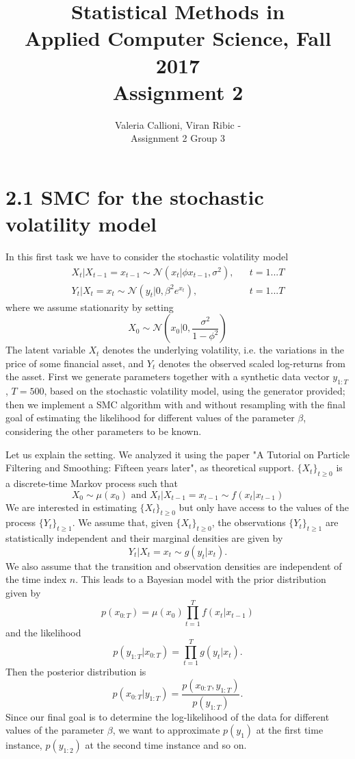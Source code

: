 \documentclass[]{article}
\title{Statistical Methods in \\ Applied Computer Science, Fall 2017 \\ Assignment 2}
\author{Valeria Callioni, Viran Ribic - \\ Assignment 2 Group 3}
\begin{document}
\maketitle

\newpage

\section*{2.1 SMC for the stochastic volatility model}
In this first task we have to consider the stochastic volatility model
\begin{align*}
	X_t|X_{t-1} = x_{t-1} \sim \mathcal{N}(x_t | \phi x_{t-1},\sigma^2), && t=1...T 
	\\
	Y_t|X_t = x_t \sim \mathcal{N}(y_t | 0, \beta^2e^{x_t}), && t=1...T 
\end{align*}
where we assume stationarity by setting 
$$
X_0 \sim \mathcal{N}(x_0 | 0, \frac{\sigma^2}{1-\phi^2})
$$
The latent variable $X_t$ denotes the underlying volatility, i.e. the variations in the price of some ﬁnancial asset, and $Y_t$ denotes the observed scaled log-returns from the asset. 
First we generate parameters together with a synthetic data vector $y_{1:T}$, $T = 500$, based on the stochastic volatility model, using the generator provided; then we implement a SMC algorithm with and without resampling with the final goal of estimating the likelihood for different values of the parameter $\beta$, considering the other parameters to be known. 

Let us explain the setting. We analyzed it using the paper "A Tutorial on Particle Filtering and Smoothing: Fifteen years later", as theoretical support. $\{X_t\}_{t\geq0}$ is a discrete-time Markov process such that 
$$
X_0 \sim \mu(x_0) \text{ and } X_t|X_{t-1} = x_{t-1} \sim f(x_t|x_{t-1})
$$
We are interested in estimating $\{X_t\}_{t\geq0}$ but only have access to the values of the process $\{Y_t\}_{t\geq1}$. We assume that, given $\{X_t\}_{t\geq0}$, the observations $\{Y_t\}_{t\geq1}$ are statistically independent and their marginal densities are given by
$$
Y_t|X_t = x_t \sim g(y_t|x_t).
$$
We also assume that the transition and observation densities are independent of the time index $n$. This leads to a Bayesian model with the prior distribution given by 
$$
p(x_{0:T}) = \mu(x_0)\prod_{t=1}^{T}f(x_t|x_{t-1})
$$
and the likelihood
$$
p(y_{1:T}|x_{0:T}) = \prod_{t=1}^{T}g(y_t|x_t).
$$
Then the posterior distribution is
$$
p(x_{0:T}|y_{1:T}) = \frac{p(x_{0:T},y_{1:T})}{p(y_{1:T})}.
$$
Since our final goal is to determine the log-likelihood of the data for different values of the parameter $\beta$, we want to approximate $p(y_1)$ at the first time instance, $p(y_{1:2})$ at the second time instance and so on.
\end{document}
